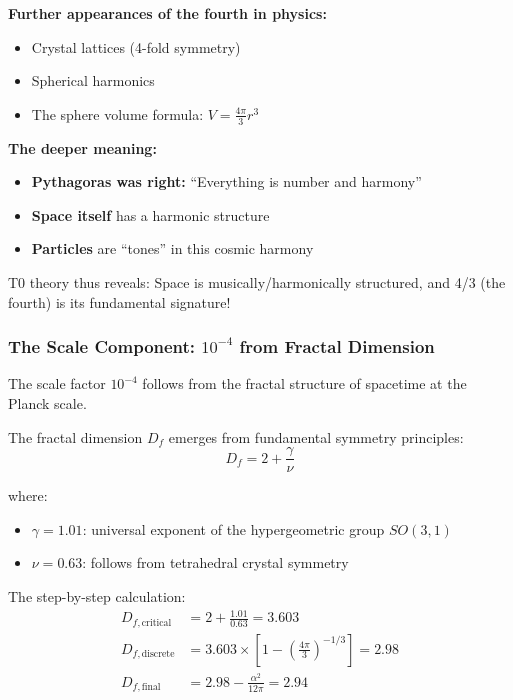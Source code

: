 \documentclass[12pt,a4paper]{article}
\begin{document}
\textbf{Further appearances of the fourth in physics:}
\begin{itemize}
	\item Crystal lattices (4-fold symmetry)
	\item Spherical harmonics
	\item The sphere volume formula: $V = \frac{4\pi}{3}r^3$
\end{itemize}

\textbf{The deeper meaning:}
\begin{itemize}
	\item \textbf{Pythagoras was right:} ``Everything is number and harmony''
	\item \textbf{Space itself} has a harmonic structure
	\item \textbf{Particles} are ``tones'' in this cosmic harmony
\end{itemize}

T0 theory thus reveals: Space is musically/harmonically structured, and 4/3 (the fourth) is its fundamental signature!

\subsubsection{The Scale Component: $10^{-4}$ from Fractal Dimension}

The scale factor $10^{-4}$ follows from the fractal structure of spacetime at the Planck scale.

The fractal dimension $D_f$ emerges from fundamental symmetry principles:
\begin{equation}
	D_f = 2 + \frac{\gamma}{\nu}
\end{equation}

where:
\begin{itemize}
	\item $\gamma = 1.01$: universal exponent of the hypergeometric group $SO(3,1)$
	\item $\nu = 0.63$: follows from tetrahedral crystal symmetry
\end{itemize}

The step-by-step calculation:
\begin{align}
	D_{f,\text{critical}} &= 2 + \frac{1.01}{0.63} = 3.603\\
	D_{f,\text{discrete}} &= 3.603 \times \left[1 - \left(\frac{4\pi}{3}\right)^{-1/3}\right] = 2.98\\
	D_{f,\text{final}} &= 2.98 - \frac{\alpha^2}{12\pi} = 2.94
\end{align}
\end{document}
